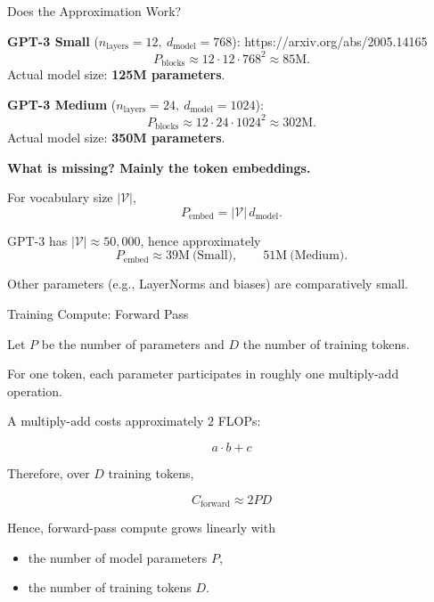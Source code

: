 \documentclass[11pt,compress,t,notes=noshow, xcolor=table]{beamer}
\begin{document}

\begin{vbframe}{Does the Approximation Work?}

\textbf{GPT-3 Small} ($n_{\text{layers}}=12,\ d_{\text{model}}=768$): 
{https://arxiv.org/abs/2005.14165}
\[
P_{\text{blocks}}
\approx
12 \cdot 12 \cdot 768^2
\approx
85\text{M}.
\]
Actual model size: \textbf{125M parameters}.

\textbf{GPT-3 Medium} ($n_{\text{layers}}=24,\ d_{\text{model}}=1024$):
\[
P_{\text{blocks}}
\approx
12 \cdot 24 \cdot 1024^2
\approx
302\text{M}.
\]
Actual model size: \textbf{350M parameters}.

\textbf{What is missing? Mainly the token embeddings.}

For vocabulary size $|\mathcal V|$,
\[
P_{\text{embed}} = |\mathcal V|\,d_{\text{model}}.
\]

GPT-3 has $|\mathcal V|\approx 50{,}000$, hence approximately
\[
P_{\text{embed}}
\approx
39\text{M}\ \text{(Small)},\qquad
51\text{M}\ \text{(Medium)}.
\]

Other parameters (e.g., LayerNorms and biases) are comparatively small.

\end{vbframe}


\begin{vbframe}{Training Compute: Forward Pass}

Let $P$ be the number of parameters and $D$ the number of training tokens.

For one token, each parameter participates in roughly one
multiply-add operation.

A multiply-add costs approximately $2$ FLOPs:

\[
a \cdot b + c
\]

Therefore, over $D$ training tokens,

\[
\boxed{
C_{\text{forward}} \approx 2PD
}
\]

Hence, forward-pass compute grows linearly with

\begin{itemize}
    \item the number of model parameters $P$,
    \item the number of training tokens $D$.
\end{itemize}

\end{vbframe}
\end{document}

